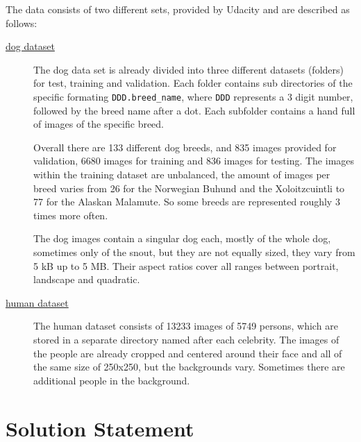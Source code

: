 \documentclass[paper=A4, DIV=10, parskip=half]{scrartcl}
\begin{document}
The data consists of two different sets, provided by Udacity and are described as follows:

\begin{description}
  \item[\href{https://s3-us-west-1.amazonaws.com/udacity-aind/dog-project/dogImages.zip}{dog dataset}]
  The dog data set is already divided into three different datasets (folders)
  for test, training and validation. Each folder contains sub directories of the specific
  formating \texttt{DDD.breed\_name}, where \texttt{DDD} represents a 3 digit number,
  followed by the breed name after a dot. Each subfolder contains a hand full of images of
  the specific breed.
  
  Overall there are 133 different dog breeds, and 835 images provided for validation, 6680
  images for training and 836 images for testing. The images within the training dataset
  are unbalanced, the amount of images per breed varies from 26 for the Norwegian Buhund
  and the Xoloitzcuintli to 77 for the Alaskan Malamute. So some breeds are represented
  roughly 3 times more often.
  
  The dog images contain a singular dog each, mostly of the whole dog, sometimes only of
  the snout, but they are not equally sized, they vary from 5 kB up to 5 MB. Their aspect
  ratios cover all ranges between portrait, landscape and quadratic.
  
  \item[\href{https://s3-us-west-1.amazonaws.com/udacity-aind/dog-project/lfw.zip}{human dataset}]
  The human dataset consists of 13233 images of 5749 persons, which are stored in a
  separate directory named after each  celebrity. The images of the people are already
  cropped and centered around their face and all of the same size of 250x250, but
  the backgrounds vary. Sometimes there are additional people in the background.
\end{description}


\section*{Solution Statement}
\end{document}
